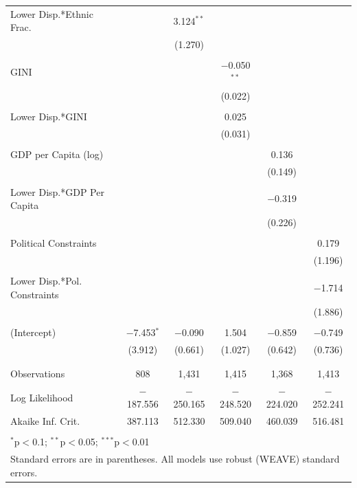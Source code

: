\documentclass[a4paper]{article}\usepackage[]{graphicx}\usepackage[]{color}
\begin{document}
\begin{table}
\begin{center}
{\begin{tabular}{@{\extracolsep{5pt}}lccccc}
 Lower Disp.*Ethnic Frac. &  & 3.124$^{**}$ &  &  &  \\ 
  &  & (1.270) &  &  &  \\ 
  & & & & & \\ 
 GINI &  &  & $-$0.050$^{**}$ &  &  \\ 
  &  &  & (0.022) &  &  \\ 
  & & & & & \\ 
 Lower Disp.*GINI &  &  & 0.025 &  &  \\ 
  &  &  & (0.031) &  &  \\ 
  & & & & & \\ 
 GDP per Capita (log) &  &  &  & 0.136 &  \\ 
  &  &  &  & (0.149) &  \\ 
  & & & & & \\ 
 Lower Disp.*GDP Per Capita &  &  &  & $-$0.319 &  \\ 
  &  &  &  & (0.226) &  \\ 
  & & & & & \\ 
 Political Constraints &  &  &  &  & 0.179 \\ 
  &  &  &  &  & (1.196) \\ 
  & & & & & \\ 
 Lower Disp.*Pol. Constraints &  &  &  &  & $-$1.714 \\ 
  &  &  &  &  & (1.886) \\ 
  & & & & & \\ 
 (Intercept) & $-$7.453$^{*}$ & $-$0.090 & 1.504 & $-$0.859 & $-$0.749 \\ 
  & (3.912) & (0.661) & (1.027) & (0.642) & (0.736) \\ 
  & & & & & \\ 
\hline \\[-1.8ex] 
Observations & 808 & 1,431 & 1,415 & 1,368 & 1,413 \\ 
Log Likelihood & $-$187.556 & $-$250.165 & $-$248.520 & $-$224.020 & $-$252.241 \\ 
Akaike Inf. Crit. & 387.113 & 512.330 & 509.040 & 460.039 & 516.481 \\ 
\hline 
\hline \\[-1.8ex] 
\multicolumn{6}{l}{$^{*}$p$<$0.1; $^{**}$p$<$0.05; $^{***}$p$<$0.01} \\ 
\multicolumn{6}{l}{Standard errors are in parentheses. All models use robust (WEAVE) standard errors.} \\ 
\end{tabular} 

    }
    \end{center}
\end{table}
\end{document}
